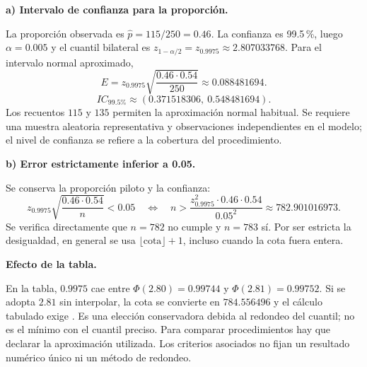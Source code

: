 \textbf{a) Intervalo de confianza para la proporción.}\par\nopagebreak[4]
La proporción observada es $\widehat p=115/250=0.46$. La confianza es 99.5\,\%, luego $\alpha=0.005$ y el cuantil bilateral es $z_{1-\alpha/2}=z_{0.9975}\approx2.807033768$.
Para el intervalo normal aproximado,
\[
E=z_{0.9975}\sqrt{\frac{0.46\cdot0.54}{250}}\approx0.088481694.
\]
\[
\boxed{IC_{\text{99.5\%}}\approx(0.371518306,\ 0.548481694).}
\]
Los recuentos $115$ y $135$ permiten la aproximación normal habitual. Se requiere una muestra aleatoria representativa y observaciones independientes en el modelo; el nivel de confianza se refiere a la cobertura del procedimiento.

\textbf{b) Error estrictamente inferior a 0.05.}\par\nopagebreak[4]
Se conserva la proporción piloto y la confianza:
\[
z_{0.9975}\sqrt{\frac{0.46\cdot0.54}{n}}<0.05
\quad\Longleftrightarrow\quad
n>\frac{z_{0.9975}^2\cdot0.46\cdot0.54}{0.05^2}
\approx782.901016973.
\]
Se verifica directamente que $n=782$ no cumple y $n=783$ sí. Por ser estricta la desigualdad, en general se usa $\lfloor\text{cota}\rfloor+1$, incluso cuando la cota fuera entera.

\textbf{Efecto de la tabla.}\par\nopagebreak[4]
En la tabla, $0.9975$ cae entre $\Phi(2.80)=0.99744$ y $\Phi(2.81)=0.99752$. Si se adopta $2.81$ sin interpolar, la cota se convierte en $784.556496$ y el cálculo tabulado exige . Es una elección conservadora debida al redondeo del cuantil; no es el mínimo con el cuantil preciso. Para comparar procedimientos hay que declarar la aproximación utilizada. Los criterios asociados no fijan un resultado numérico único ni un método de redondeo.
